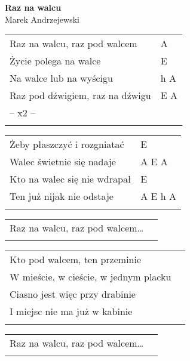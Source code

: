 \documentclass[a5paper]{article}
\begin{document}


\noindent
\fontsize{12pt}{15pt}\selectfont
\textbf{Raz na walcu} \\
\fontsize{8pt}{10pt}\selectfont
Marek Andrzejewski \\
\fontsize{10pt}{12pt}\selectfont

\begin{tabular}{@{}p{6.50cm}p{3cm}@{}}
\noindent
Raz na walcu, raz pod walcem & A \\
Życie polega na walce & E \\
Na walce lub na wyścigu & h A \\
Raz pod dźwigiem, raz na dźwigu & E A \\
-- x2 -- \\ \\
\end{tabular}

\noindent
\begin{tabular}{@{}p{7.50cm}p{3cm}@{}}
Żeby płaszczyć i rozgniatać & E \\
Walec świetnie się nadaje & A E A \\
Kto na walec się nie wdrapał & E \\
Ten już nijak nie odstaje & A E h A \\ \\
\end{tabular}

\noindent
\begin{tabular}{@{}p{6.50cm}p{3cm}@{}}
Raz na walcu, raz pod walcem… \\ \\
\end{tabular}

\noindent
\begin{tabular}{@{}p{6.50cm}p{3cm}@{}}
Kto pod walcem, ten przeminie \\
W mieście, w cieście, w jednym placku \\
Ciasno jest więc przy drabinie\\
I miejsc nie ma już w kabinie \\ \\
\end{tabular}

\noindent
\begin{tabular}{@{}p{6.50cm}p{3cm}@{}}
Raz na walcu, raz pod walcem… \\ \\
\end{tabular}
\end{document}
